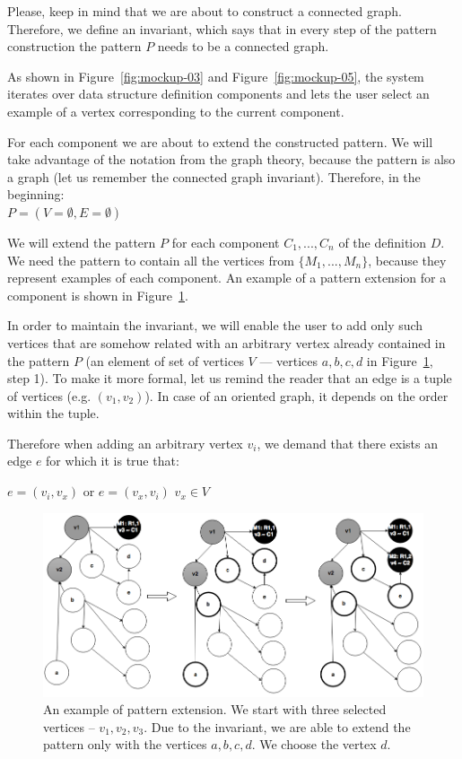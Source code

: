 Please, keep in mind that we are about to construct a 
connected graph. Therefore, we define an invariant, which says that in every 
step of the pattern construction the pattern $P$ needs to be a connected graph.

As shown in Figure~\ref{fig:mockup-03} and Figure~\ref{fig:mockup-05},
the system iterates over data 
structure definition components and lets the user select an example of a 
vertex corresponding to the current component.

For each component we are about 
to extend the constructed pattern. We will take advantage of the notation from the
graph theory, because the pattern is also a graph (let us remember the connected graph invariant).
Therefore, in the beginning:\\

{\centering $P = (V = \emptyset, E = \emptyset)$ \\[0.5cm]}

We will extend the pattern $P$ for each component $C_1, ..., C_n$ of the 
definition $D$. We need the pattern to contain all the vertices from $\{M_1 ,..., 
M_n\}$, because they represent examples of each component. An example of
a pattern extension for a component is shown in 
Figure~\ref{fig:pattern-enhancement}.

In order to maintain the invariant, we will enable the user to add only such 
vertices that are somehow related with an arbitrary vertex already contained in 
the pattern $P$ (an element of set of vertices $V$ --- vertices $a,b,c,d$
in Figure~\ref{fig:pattern-enhancement}, step 1).
To make it more formal, let us remind the reader that an edge is a tuple 
of vertices (e.g. $(v_1,v_2)$). In case of an oriented graph, it depends on the order within 
the tuple.

Therefore when adding an arbitrary vertex $v_i$, we demand that there exists an 
edge $e$ for which it is true that:

\begin{center}
{$e = (v_i,v_x)$ or $e = (v_x, v_i)$ \land $v_x \in V$ \\[0.5cm]}
\end{center}

\begin{figure}
	\centering
	\includegraphics[width=140mm]{img/pattern-enhancement.png}
	\caption{An example of pattern extension. We start with three selected vertices
	-- $v_1, v_2, v_3$. Due to the invariant, we are able to extend the pattern only with
	the vertices $a,b,c,d$. We choose the vertex $d$.}
	\label{fig:pattern-enhancement}
\end{figure}

